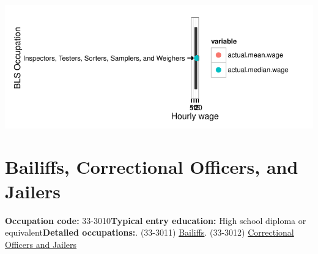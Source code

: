 \documentclass[a4paper,10pt]{article}\usepackage[]{graphicx}\usepackage[]{color}
\makeatletter
\def\maxwidth{ %
  \ifdim\Gin@nat@width>\linewidth
    \linewidth
  \else
    \Gin@nat@width
  \fi
}
\makeatother
\begin{document}
{\centering \includegraphics[width=\maxwidth]{figure/unnamed-chunk-275} 

}


\newpage\section{Bailiffs, Correctional Officers, and Jailers}\textbf{Occupation code:} 33-3010\newline\textbf{Typical entry education:} High school diploma or equivalent\newline\textbf{Detailed occupations:}. (33-3011)  \href{http://www.bls.gov/oes/current/oes333011.htm}{Bailiffs}. (33-3012)  \href{http://www.bls.gov/oes/current/oes333012.htm}{Correctional Officers and Jailers}\newline%
\end{document}
